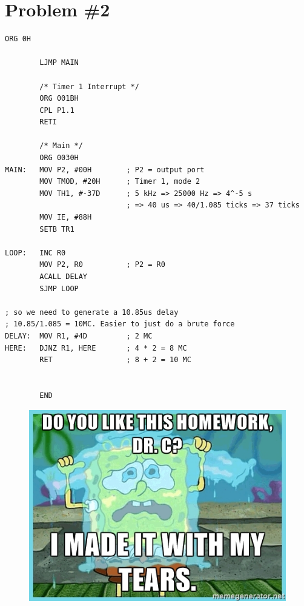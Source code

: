 \documentclass[12pt]{article}
\begin{document}
\section{Problem \#2}
\begin{lstlisting}[style=cASM]
        ORG 0H

        LJMP MAIN

        /* Timer 1 Interrupt */
        ORG 001BH
        CPL P1.1
        RETI

        /* Main */
        ORG 0030H
MAIN:   MOV P2, #00H        ; P2 = output port
        MOV TMOD, #20H      ; Timer 1, mode 2
        MOV TH1, #-37D      ; 5 kHz => 25000 Hz => 4^-5 s
                            ; => 40 us => 40/1.085 ticks => 37 ticks
        MOV IE, #88H
        SETB TR1

LOOP:   INC R0
        MOV P2, R0          ; P2 = R0
        ACALL DELAY
        SJMP LOOP

; so we need to generate a 10.85us delay
; 10.85/1.085 = 10MC. Easier to just do a brute force
DELAY:  MOV R1, #4D         ; 2 MC
HERE:   DJNZ R1, HERE       ; 4 * 2 = 8 MC
        RET                 ; 8 + 2 = 10 MC


        END
\end{lstlisting}
\begin{figure}[!ht]
    \centering
    \includegraphics{meme.jpg}
\end{figure}
\end{document}
